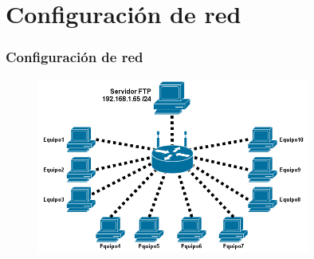 \section{Configuraci\'on de red}
  \begin{frame}
    \frametitle{Configuraci\'on de red}
      \begin{figure}
      \centering
      \includegraphics[width=0.8\textwidth]{./image/configuracionRed.png}
      \label{fig:ejemplo1}
      \end{figure}
  \end{frame}